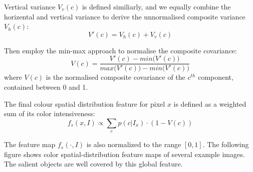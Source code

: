 \documentclass[10pt,twocolumn,letterpaper]{article}
\newcommand{\SUM}{\sum\limits}
\begin{document}
    Vertical variance $V_{v}(c)$ is defined similiarly, and we equally combine the horizental and vertical variance to derive the unnormalised composite variance $V_h (c)$: 
    $$
    V' (c) = V_h (c) + V_v (c) 
    $$

    Then employ the min-max approach to normalise the composite covariance:
    $$
    V (c) = \frac{V'(c) - min \big(V'(c)\big) }{max \big(V'(c)\big) - min \big(V'(c)\big)}  
    $$
    where $V(c)$ is the normalised composite covariance of the $c^{th}$ component, contained between 0 and 1.

    The final colour spatial distribution feature for pixel $x$ is defined as a weighted sum of its color intensiveness:
    $$
    f_s(x,I)\propto\SUM_c p(c|I_x)\cdot(1-V(c))
    $$

    The feature map $f_s (\cdot,I)$ is also normalized to the range $[0, 1]$. The following figure
    shows color spatial-distribution feature maps of several example images. 
    The salient objects are well covered by this global feature. 
\end{document}
